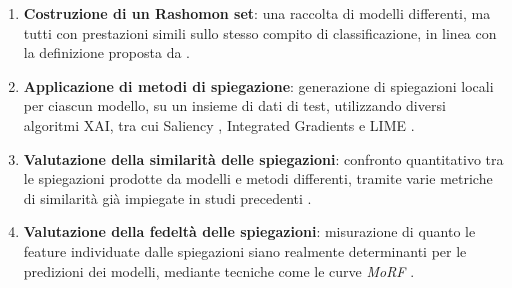 \documentclass[12pt,a4paper,oneside]{report}
\numberwithin{figure}{chapter}
\numberwithin{table}{chapter}
\begin{document}
\begin{enumerate}
      \item \textbf{Costruzione di un Rashomon set}: una raccolta di modelli differenti,
            ma tutti con prestazioni simili sullo stesso compito di classificazione,
            in linea con la definizione proposta da \citet{fisher2019all}.
      \item \textbf{Applicazione di metodi di spiegazione}: generazione di spiegazioni locali
            per ciascun modello, su un insieme di dati di test, utilizzando diversi algoritmi XAI,
            tra cui Saliency \citep{simonyan2013deep}, Integrated Gradients \citep{sundararajan2017axiomatic}
            e LIME \citep{ribeiro2016lime}.
      \item \textbf{Valutazione della similarità delle spiegazioni}: confronto quantitativo
            tra le spiegazioni prodotte da modelli e metodi differenti, tramite varie metriche di similarità
            già impiegate in studi precedenti \citep{samek2016evaluating,adebayo2018sanity}.
      \item \textbf{Valutazione della fedeltà delle spiegazioni}: misurazione di quanto le
            feature individuate dalle spiegazioni siano realmente determinanti per le predizioni dei modelli,
            mediante tecniche come le curve \emph{MoRF} \citep{samek2016evaluating}.
\end{enumerate}
\end{document}
